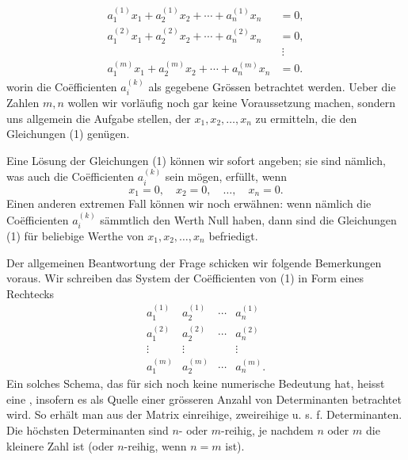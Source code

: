 
\begin{equation}
\begin{aligned}
 a_1^{(1)}x_1+a_2^{(1)}x_2+\cdots+a_n^{(1)}x_n&=0,\\
 a_1^{(2)}x_1+a_2^{(2)}x_2+\cdots+a_n^{(2)}x_n&=0,\\
 &\ \vdots\\
 a_1^{(m)}x_1+a_2^{(m)}x_2+\cdots+a_n^{(m)}x_n&=0.
\end{aligned}
\tag{1}
\end{equation}
worin die Coëfficienten $a_i^{(k)}$ als gegebene Grössen betrachtet werden. Ueber die Zahlen $m,n$ wollen wir vorläufig noch gar keine Voraussetzung machen, sondern uns allgemein die Aufgabe stellen,  der $x_1,x_2,\ldots,x_n$ zu ermitteln, die den Gleichungen (1) genügen.

Eine Lösung der Gleichungen (1) können wir sofort angeben; sie sind nämlich, was auch die Coëfficienten $a_i^{(k)}$ sein mögen, erfüllt, wenn
\begin{equation}
 x_1=0,\quad x_2=0,\quad \ldots,\quad x_n=0.
\tag{2}
\end{equation}
Einen anderen extremen Fall können wir noch erwähnen: wenn nämlich die Coëfficienten $a_i^{(k)}$ sämmtlich den Werth Null haben, dann sind die Gleichungen (1) für beliebige Werthe von $x_1,x_2,\ldots,x_n$ befriedigt.

Der allgemeinen Beantwortung der Frage schicken wir folgende Bemerkungen voraus. Wir schreiben das System der Coëfficienten von (1) in Form eines Rechtecks
\begin{equation}
\begin{array}{cccc}
 a_1^{(1)}&a_2^{(1)}&\cdots&a_n^{(1)}\\
 a_1^{(2)}&a_2^{(2)}&\cdots&a_n^{(2)}\\
 \vdots&\vdots&&\vdots\\
 a_1^{(m)}&a_2^{(m)}&\cdots&a_n^{(m)}.
\end{array}
\tag{3}
\end{equation}
Ein solches Schema, das für sich noch keine numerische Bedeutung hat, heisst eine , insofern es als Quelle einer grösseren Anzahl von Determinanten betrachtet wird.  So erhält man aus der Matrix einreihige, zweireihige u. s. f. Determinanten. Die höchsten Determinanten sind $n$- oder $m$-reihig, je nachdem $n$ oder $m$ die kleinere Zahl ist (oder $n$-reihig, wenn $n=m$ ist).
